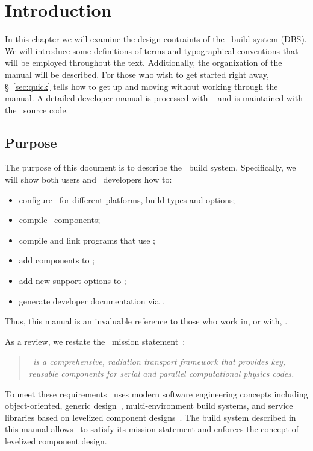 
\chapter{Introduction}

In this chapter we will examine the %
design contraints of the \draco\ build system (DBS).  We will
introduce some definitions of terms and typographical conventions that
will be employed throughout the text.  Additionally, the organization
of the manual will be described.  For those who wish to get started
right away, \S~\ref{sec:quick} tells how to get up and moving without
working through the manual.  A detailed developer manual is processed
with ~\cite{doxygen} and is maintained with the
\draco\ source code.


\section{Purpose}
\label{sec:purpose}

The purpose of this document is to describe the \draco\ build system.
Specifically, we will show both users and \draco\ developers how to: 
\begin{itemize}
\item configure \draco\ for different platforms, build types and options; 
\item compile \draco\ components; 
\item compile and link programs that use \draco;
\item add components to \draco;
\item add new support options to \draco;
\item generate developer documentation via .
\end{itemize}
Thus, this manual is an invaluable reference to those who work in, or
with, \draco.

As a review, we restate the \draco\ mission statement~\cite{rn98046}:
\begin{quote}
  \slshape \draco\ is a comprehensive, radiation transport framework
  that provides key, reusable components for serial and parallel %
  computational physics codes.
\end{quote}  
To meet these requirements \draco\ uses modern software engineering
concepts including object-oriented, generic design~\cite{ooadid}, multi-environment
build systems, and service libraries based on levelized component
designs~\cite{la96}.  The build system described in this manual allows \draco\ to
satisfy its mission statement and enforces the concept of levelized
component design.

